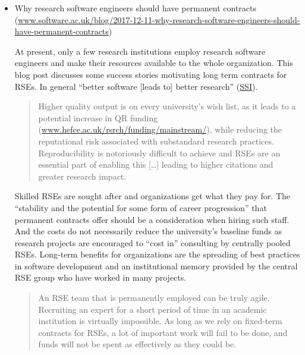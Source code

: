 \documentclass[11pt,letterpaper]{article}
\begin{document}
\begin{itemize}
\item Why research software engineers should have permanent contracts \\(\href{https://www.software.ac.uk/blog/2017-12-11-why-research-software-engineers-should-have-permanent-contracts}{www.software.ac.uk/blog/2017-12-11-why-research-software-engineers-should-have-permanent-contracts})

\noindent At present, only a few research institutions employ research software engineers and make their resources available to the whole organization. This blog post discusses some success stories motivating long term contracts for RSEs. In general ``better software [leads to] better research'' (\href{https://software.ac.uk/}{SSI}).
\begin{quote}
Higher quality output is on every university's wish list, as it leads to a potential increase in QR funding (\href{http://www.hefce.ac.uk/rsrch/funding/mainstream/}{www.hefce.ac.uk/rsrch/funding/mainstream/}), while reducing the reputational risk associated with substandard research practices.
Reproducibility is notoriously difficult to achieve and RSEs are an essential part of enabling this [\ldots] leading to higher citations and greater research impact.
\end{quote}
Skilled RSEs are sought after and organizations get what they pay for. The ``stability and the potential for some form of career progression'' that permanent contracts offer should be a consideration when hiring such staff. And the costs do not necessarily reduce the university's baseline funds as research projects are encouraged to ``cost in'' consulting by centrally pooled RSEs. Long-term benefits for organizations are the spreading of best practices in software development and an institutional memory provided by the central RSE group who have worked in many projects. 
\begin{quote}
An RSE team that is permanently employed can be truly agile. Recruiting an expert for a short period of time in an academic institution is virtually impossible. As long as we rely on fixed-term contracts for RSEs, a lot of important work will fail to be done, and funds will not be spent as effectively as they could be.
\end{quote}


\end{itemize}
\end{document}

